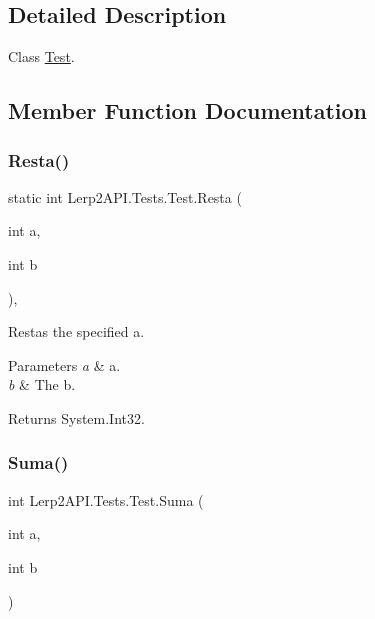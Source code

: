 \subsection{Detailed Description}
Class \hyperlink{class_lerp2_a_p_i_1_1_tests_1_1_test}{Test}. 



\subsection{Member Function Documentation}
\mbox{\label{class_lerp2_a_p_i_1_1_tests_1_1_test_ac97c19d970a06b22b01a3962b5978413}} 
\subsubsection{\texorpdfstring{Resta()}{Resta()}}
{\footnotesize\ttfamily static int Lerp2\+A\+P\+I.\+Tests.\+Test.\+Resta (\begin{DoxyParamCaption}\item[{int}]{a,  }\item[{int}]{b }\end{DoxyParamCaption})\hspace{0.3cm}{\ttfamily [inline]}, {\ttfamily [static]}}



Restas the specified a. 


\begin{DoxyParams}{Parameters}
{\em a} & a.\\
\hline
{\em b} & The b.\\
\hline
\end{DoxyParams}
\begin{DoxyReturn}{Returns}
System.\+Int32.
\end{DoxyReturn}
\mbox{\label{class_lerp2_a_p_i_1_1_tests_1_1_test_a46da4cdc88b439a8d40bd10ebae4502e}} 
\subsubsection{\texorpdfstring{Suma()}{Suma()}}
{\footnotesize\ttfamily int Lerp2\+A\+P\+I.\+Tests.\+Test.\+Suma (\begin{DoxyParamCaption}\item[{int}]{a,  }\item[{int}]{b }\end{DoxyParamCaption})\hspace{0.3cm}{\ttfamily [inline]}}



